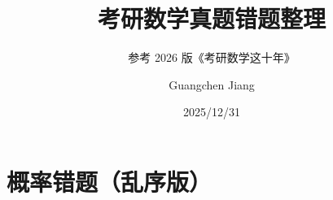 \documentclass[lang=cn,math=mtpro2,11pt,scheme=chinese]{elegantbook}
\title{考研数学真题错题整理}
\subtitle{参考 2026 版《考研数学这十年》}
\author{Guangchen Jiang}
\date{2025/12/31}
\begin{document}


\mainmatter

\chapter*{概率错题（乱序版）}




\end{document}
